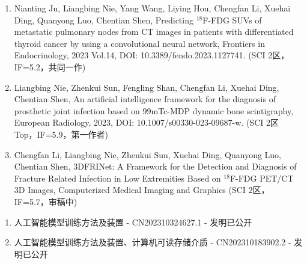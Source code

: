 \begin{publications}
    \begin{enumerate}
        \item Nianting Ju, Liangbing Nie, Yang Wang, Liying Hou, Chengfan Li, Xuehai Ding, Quanyong Luo, Chentian Shen, Predicting \(^{18}\)F-FDG SUVs of metastatic pulmonary nodes from CT images in patients with differentiated thyroid cancer by using a convolutional neural network, Frontiers in Endocrinology, 2023 Vol.14, DOI: 10.3389/fendo.2023.1127741. (SCI 2区，IF=5.2，共同一作)
        \item Liangbing Nie, Zhenkui Sun, Fengling Shan, Chengfan Li, Xuehai Ding, Chentian Shen, An artificial intelligence framework for the diagnosis of prosthetic joint infection based on 99mTc-MDP dynamic bone scintigraphy, European Radiology, 2023, DOI: 10.1007/s00330-023-09687-w. (SCI 2区 Top，IF=5.9，第一作者)
        \item Chengfan Li, Liangbing Nie, Zhenkui Sun, Xuehai Ding, Quanyong Luo, Chentian Shen, 3DFRINet: A Framework for the Detection and Diagnosis of Fracture Related Infection in Low Extremities Based on \(^{18}\)F-FDG PET/CT 3D Images, Computerized Medical Imaging and Graphics (SCI 2区，IF=5.7，审稿中)
    \end{enumerate}

    \begin{enumerate}
        \item 人工智能模型训练方法及装置 - CN202310324627.1 - 发明已公开
        \item 人工智能模型训练方法及装置、计算机可读存储介质 - CN202310183902.2 - 发明已公开
    \end{enumerate}
\end{publications}